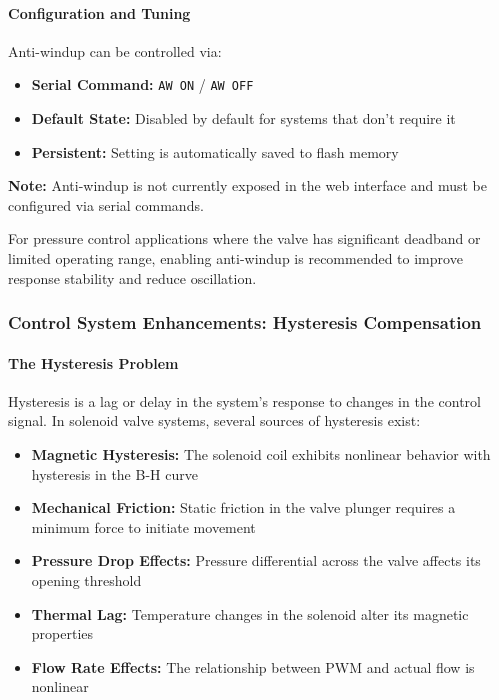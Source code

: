\documentclass[12pt,a4paper]{article}
\begin{document}
\paragraph{Configuration and Tuning}
Anti-windup can be controlled via:

\begin{itemize}
    \item \textbf{Serial Command:} \texttt{AW ON} / \texttt{AW OFF}
    \item \textbf{Default State:} Disabled by default for systems that don't require it
    \item \textbf{Persistent:} Setting is automatically saved to flash memory
\end{itemize}

\textbf{Note:} Anti-windup is not currently exposed in the web interface and must be configured via serial commands.

For pressure control applications where the valve has significant deadband or limited operating range, enabling anti-windup is recommended to improve response stability and reduce oscillation.

\subsubsection{Control System Enhancements: Hysteresis Compensation}

\paragraph{The Hysteresis Problem}
Hysteresis is a lag or delay in the system's response to changes in the control signal. In solenoid valve systems, several sources of hysteresis exist:

\begin{itemize}
    \item \textbf{Magnetic Hysteresis:} The solenoid coil exhibits nonlinear behavior with hysteresis in the B-H curve
    \item \textbf{Mechanical Friction:} Static friction in the valve plunger requires a minimum force to initiate movement
    \item \textbf{Pressure Drop Effects:} Pressure differential across the valve affects its opening threshold
    \item \textbf{Thermal Lag:} Temperature changes in the solenoid alter its magnetic properties
    \item \textbf{Flow Rate Effects:} The relationship between PWM and actual flow is nonlinear
\end{itemize}
\end{document}
